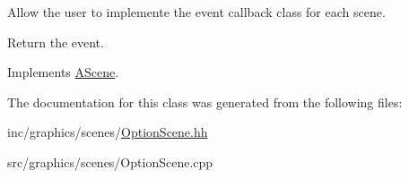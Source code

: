 Allow the user to implemente the event callback class for each scene. 

Return the event. 

Implements \hyperlink{classAScene_af521e5e6d30a5d2e5d30eb333e4d3abd}{A\+Scene}.



The documentation for this class was generated from the following files\+:\begin{DoxyCompactItemize}
\item 
inc/graphics/scenes/\hyperlink{OptionScene_8hh}{Option\+Scene.\+hh}\item 
src/graphics/scenes/Option\+Scene.\+cpp\end{DoxyCompactItemize}
